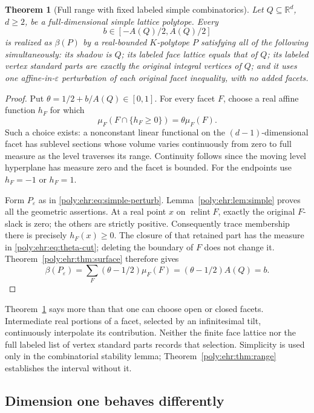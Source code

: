 \documentclass[11pt,a4paper]{article}
\numberwithin{equation}{section}
\newtheorem{theorem}{Theorem}[section]
\theoremstyle{plain}
\newcommand{\R}{\mathbb R}
\newcommand{\eps}{\varepsilon}
\newcommand{\relint}{\operatorname{relint}}
\begin{document}
\begin{theorem}[Full range with fixed labeled simple combinatorics]
\label{poly:ehr:thm:simple-range}
Let $Q\subseteq\R^d$, $d\geq2$, be a full-dimensional simple lattice
polytope. Every
\[
 b\in[-A(Q)/2,A(Q)/2]
\]
is realized as $\beta(P)$ by a real-bounded $K$-polytope $P$ satisfying all
of the following simultaneously: its shadow is $Q$; its labeled face
lattice equals that of $Q$; its labeled vertex standard parts are exactly
the original integral vertices of $Q$; and it uses one affine-in-$\eps$
perturbation of each original facet inequality, with no added facets.
\end{theorem}
\begin{proof}
Put $\theta=1/2+b/A(Q)\in[0,1]$. For every facet $F$, choose a real affine
function $h_F$ for which
\begin{equation}\label{poly:ehr:eq:theta-cut}
 \mu_F(F\cap\{h_F\geq0\})=\theta\mu_F(F).
\end{equation}
Such a choice exists: a nonconstant linear functional on the
$(d-1)$-dimensional facet has sublevel sections whose volume varies
continuously from zero to full measure as the level traverses its range.
Continuity follows since the moving level hyperplane has measure zero
and the facet is bounded. For the endpoints use $h_F=-1$ or $h_F=1$.

Form $P_\eps$ as in \eqref{poly:ehr:eq:simple-perturb}. Lemma~\ref{poly:ehr:lem:simple}
proves all the geometric assertions. At a real point $x$ on
$\relint F$, exactly the original $F$-slack is zero; the others are
strictly positive. Consequently trace membership there is precisely
$h_F(x)\geq0$. The closure of that retained part has the measure in
\eqref{poly:ehr:eq:theta-cut}; deleting the boundary of $F$ does not change it.
Theorem~\ref{poly:ehr:thm:surface} therefore gives
\[
 \beta(P_\eps)=\sum_F(\theta-1/2)\mu_F(F)
             =(\theta-1/2)A(Q)=b.
\]
\end{proof}

Theorem~\ref{poly:ehr:thm:simple-range} says more than that one can choose open or
closed facets. Intermediate real portions of a facet, selected by an
infinitesimal tilt, continuously interpolate its contribution. Neither the
finite face lattice nor the full labeled list of vertex standard parts
records that selection. Simplicity is used only in the combinatorial
stability lemma; Theorem~\ref{poly:ehr:thm:range} establishes the interval without it.

\subsection{Dimension one behaves differently}
\end{document}
